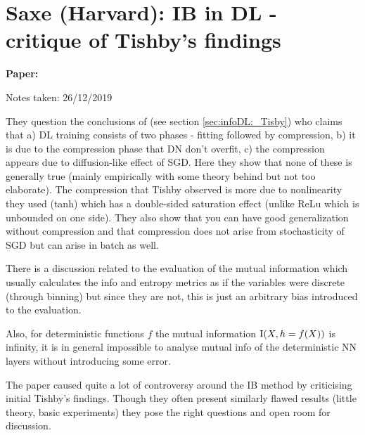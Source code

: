 \clearpage

\section{Saxe (Harvard): IB in DL - critique of Tishby's findings}\label{sec:ibDL}

\begin{notebox}
\textbf{Paper: } 

\hfill Notes taken: 26/12/2019 
\end{notebox}

They question the conclusions of \parencite{tishbyInformationTheoryDeep2017} (see section \ref{sec:infoDL:_Tisby}) who claims that a) DL training consists of two phases - fitting followed by compression, b) it is due to the compression phase that DN don't overfit, c) the compression appears due to diffusion-like effect of SGD. Here they show that none of these is generally true (mainly empirically with some theory behind but not too elaborate). The compression that Tishby observed is more due to nonlinearity they used (tanh) which has a double-sided saturation effect (unlike ReLu which is unbounded on one side). They also show that you can have good generalization without compression and that compression does not arise from stochasticity of SGD but can arise in batch as well.

There is a discussion related to the evaluation of the mutual information which usually calculates the info and entropy metrics as if the variables were discrete (through binning) but since they are not, this is just an arbitrary bias introduced to the evaluation.

Also, for deterministic functions $f$ the mutual information $\mathrm{I}(X, h=f(X))$ is infinity, it is in general impossible to analyse mutual info of the deterministic NN layers without introducing some error.

\begin{notebox}
\concl The paper caused quite a lot of controversy around the IB method by criticising initial Tishby's findings. Though they often present similarly flawed results (little theory, basic experiments) they pose the right questions and open room for discussion.
\end{notebox}


